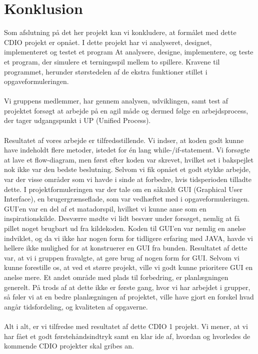 \chapter{Konklusion}

Som afslutning på det her projekt kan vi konkludere, at formålet med dette CDIO projekt er opnået. 
I dette projekt har vi analyseret, designet, implementeret og testet et program
At analysere, designe, implementere, og teste et program, der simulere et terningsspil mellem to spillere.
Kravene til programmet, herunder størstedelen af de ekstra funktioner stillet i opgaveformuleringen.
\\
\\
Vi gruppens medlemmer, har gennem analysen, udviklingen, samt test af projektet forsøgt at arbejde på en agil måde og dermed følge en arbejdsprocess, der tager udgangspunkt i UP (Unified Process).
\\
\\
Resultatet af vores arbejde er tilfredsstillende.
Vi indser, at koden godt kunne have indeholdt flere metoder, istedet for én lang while-/if-statement.
Vi forsøgte at lave et flow-diagram, men først efter koden var skrevet, hvilket set i bakspejlet nok ikke var den bedste beslutning.
Selvom vi fik opnået et godt stykke arbejde, var der visse områder som vi havde i sinde at forbedre, hvis tidsperioden tilladte dette.
I projektformuleringen var der tale om en såkaldt GUI (Graphical User Interface), en brugergrænseflade, som var vedhæftet med i opgaveformuleringen.
GUI’en var en del af et matadorspil, hvilket vi kunne anse som en inspirationskilde.
Desværre mødte vi lidt besvær under forsøget, nemlig at få pillet noget brugbart ud fra kildekoden.
Koden til GUI’en var nemlig en anelse indviklet, og da vi ikke har nogen form for tidligere erfaring med JAVA, havde vi hellere ikke mulighed for at konstruerer en GUI fra bunden.
Resultatet af dette var, at vi i gruppen fravalgte, at gøre brug af nogen form for GUI.
Selvom vi kunne forestille os, at ved et større projekt, ville vi godt kunne prioritere GUI en anelse mere.
Et andet område med plads til forbedring, er planlægningen generelt. 
På trods af at dette ikke er første gang, hvor vi har arbejdet i grupper, så føler vi at en bedre planlægningen af projektet, ville have gjort en forskel hvad angår tidsfordeling, og kvaliteten af opgaverne.
\\
\\
Alt i alt, er vi tilfredse med resultatet af dette CDIO 1 projekt.
Vi mener, at vi har fået et godt førstehåndsindtryk samt en klar ide af, hvordan og hvorledes de kommende CDIO projekter skal gribes an.
